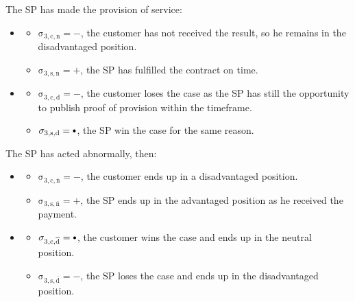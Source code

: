 \documentclass{ieeeaccess}
\newcommand\neutral[1][.75]{\mathbin{\ThisStyle{\vcenter{\hbox{%
  \scalebox{#1}{$\SavedStyle\bullet$}}}}}%
}
\begin{document}
The SP has made the provision of service:

\begin{itemize}
\item \AgreeablePath
  \begin{itemize}
    \item \(\operatorname{\sigma_{3, c, n} = -}\), the customer has not received the result, so he remains in the disadvantaged position. 
    \item \(\operatorname{\sigma_{3, s, n} = +}\), the SP has fulfilled the contract on time.
  \end{itemize}
\item \DisputePath
  \begin{itemize}
    \item \(\operatorname{\sigma_{3, c, d} = -}\), the customer loses the case as the SP has still the opportunity to publish proof of provision within the timeframe. 
    \item \(\operatorname{\sigma_{3, s, d} = \neutral}\), the SP win the case for the same reason.
  \end{itemize}
\end{itemize}

The SP has acted abnormally, then:

\begin{itemize}
\item \AgreeablePath
  \begin{itemize}
    \item \(\operatorname{\sigma_{3, c, \overline{n}} = -}\), the customer ends up in a disadvantaged position.
    \item \(\operatorname{\sigma_{3, s, \overline{n}} = +}\), the SP ends up in the advantaged position as he received the payment. 
  \end{itemize}
\item \DisputePath
  \begin{itemize}
    \item \(\operatorname{\sigma_{3, c, \overline{d}} = \neutral}\), the customer wins the case and ends up in the neutral position.
    \item \(\operatorname{\sigma_{3, s, \overline{d}} = -}\), the SP loses the case and ends up in the disadvantaged position. 
  \end{itemize}
\end{itemize}

\Fairness
\end{document}

